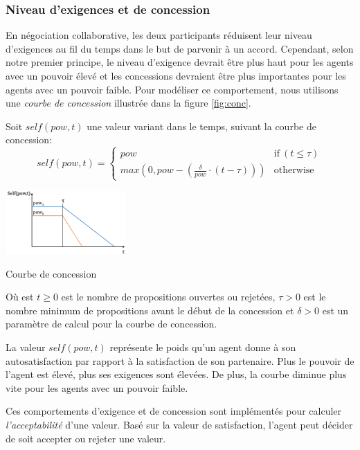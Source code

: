 \documentclass [french]{sig-alternate-05-2015}
\begin{document}
			\subsubsection {Niveau d'exigences et de concession}
			
			En négociation collaborative, les deux participants réduisent leur niveau d'exigences au fil du temps dans le but de parvenir à un accord. Cependant, selon notre premier principe, le niveau d'exigence devrait être plus haut pour les agents avec un pouvoir élevé et les concessions devraient être plus importantes pour les agents avec un pouvoir faible. Pour modéliser ce comportement, nous utilisons une \emph {courbe de concession} illustrée dans la figure \ref {fig:conc}.
			
			Soit $ self (pow, t) $ une valeur variant dans le temps, suivant la courbe de concession:
				\begin{equation}
				self(pow, t) = \left\{\begin{array}{ll}
				pow & \mathrm{if\ } (t \leq \tau)\\
				max(0, pow - (\frac{\delta}{pow} \cdot (t - \tau))) & \mathrm{otherwise}
				\end{array}\right.
				\end{equation}
	
				\begin{floatingfigure}[r]{1.8in}
					\includegraphics[width=1.8in]{graphs/sv3.png}
					\caption{\label{fig:conc}Courbe de concession}
				\end{floatingfigure} 
				
			Où est $ t \geq 0 $ est le nombre de propositions ouvertes ou rejetées, $ \tau> 0 $ est le nombre minimum de propositions avant le début de la concession et $ \delta> 0 $ est un paramètre de calcul pour la courbe de concession.
		
		La valeur $ self (pow, t) $ représente le poids qu'un agent donne à son autosatisfaction par rapport à la satisfaction de son partenaire. Plus le pouvoir de l'agent est élevé, plus ses exigences sont élevées. De plus, la courbe diminue plus vite pour les agents avec un pouvoir faible.
		
		Ces comportements d'exigence et de concession sont implémentés pour calculer \textit{l'acceptabilité} d'une valeur. Basé sur la valeur de satisfaction, l'agent peut décider de soit accepter ou rejeter une valeur.
		
\end{document}
